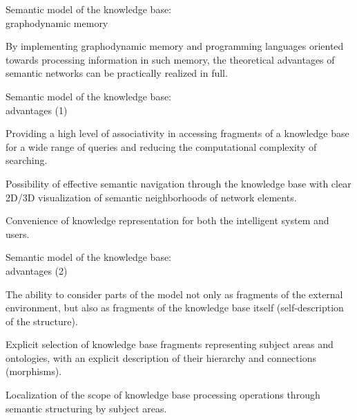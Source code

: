 \begin{frame}{Semantic model of the knowledge base:\\graphodynamic memory}
	\topline
	\justifying
	
	By implementing graphodynamic memory and programming languages oriented towards processing information in such memory, the theoretical advantages of semantic networks can be practically realized in full.
	
\end{frame}


\begin{frame}{Semantic model of the knowledge base:\\advantages (1)}
	\topline
	\justifying
	
	\begin{textitemize}
		\item Providing a high level of associativity in accessing fragments of a knowledge base for a wide range of queries and reducing the computational complexity of searching.
		\item Possibility of effective semantic navigation through the knowledge base with clear 2D/3D visualization of semantic neighborhoods of network elements.
		\item Convenience of knowledge representation for both the intelligent system and users.
	\end{textitemize}
	
\end{frame}


\begin{frame}{Semantic model of the knowledge base:\\advantages (2)}
	\topline
	\justifying
	
	\begin{textitemize}
		\item The ability to consider parts of the model not only as fragments of the external environment, but also as fragments of the knowledge base itself (self-description of the structure).
		\item Explicit selection of knowledge base fragments representing subject areas and ontologies, with an explicit description of their hierarchy and connections (morphisms).
		\item Localization of the scope of knowledge base processing operations through semantic structuring by subject areas.
	\end{textitemize}
	
\end{frame}


